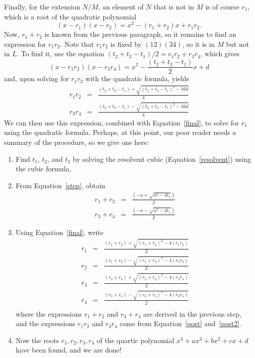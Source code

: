 \documentclass[12pt]{article}
\begin{document}
Finally, for the extension $N/M$, an element of $N$ that is not in $M$
is of course $r_1$, which is a root of the quadratic polynomial
\begin{equation}\label{final}
(x-r_1)(x-r_2) = x^2 - (r_1+r_2) x + r_1 r_2.
\end{equation}
Now, $r_1+r_2$ is known from the previous paragraph, so it remains to
find an expression for $r_1 r_2$. Note that $r_1 r_2$ is fixed by
$(12)(34)$, so it is in $M$ but not in $L$. To find it, use the
equation $(t_2 + t_3 - t_1)/2 = r_1 r_2 + r_3 r_4$, which gives
$$
(x - r_1 r_2) (x - r_3 r_4) = x^2 - \frac{(t_2 + t_3 - t_1)}{2} x + d
$$
and, upon solving for $r_1 r_2$ with the quadratic formula, yields
\begin{eqnarray}
\label{post}
r_1 r_2 & = & \frac{(t_2 + t_3 - t_1) + \sqrt{(t_2 + t_3 - t_1)^2 - 16d}}{4} \\
\label{post2}
r_3 r_4 & = & \frac{(t_2 + t_3 - t_1) - \sqrt{(t_2 + t_3 - t_1)^2 - 16d}}{4}
\end{eqnarray}
We can then use this expression, combined with Equation~\eqref{final},
to solve for $r_1$ using the quadratic formula. Perhaps, at this
point, our poor reader needs a summary of the procedure, so we give one
here:
\begin{enumerate}
\item Find $t_1$, $t_2$, and $t_3$ by solving the resolvent cubic
  (Equation~\eqref{resolvent}) using the cubic formula,
\item From Equation~\eqref{step}, obtain
\begin{eqnarray*}
r_1+r_2 & = & \frac{(-a + \sqrt{a^2 - 4 t_1})}{2} \\
r_3+r_4 & = & \frac{(-a - \sqrt{a^2 - 4 t_1})}{2}
\end{eqnarray*}
\item Using Equation~\eqref{final}, write
\begin{eqnarray*}
r_1 & = & \frac{(r_1+r_2) + \sqrt{(r_1+r_2)^2 - 4 (r_1 r_2)}}{2} \\
r_2 & = & \frac{(r_1+r_2) - \sqrt{(r_1+r_2)^2 - 4 (r_1 r_2)}}{2} \\
r_3 & = & \frac{(r_3+r_4) + \sqrt{(r_3+r_4)^2 - 4 (r_3 r_4)}}{2} \\
r_4 & = & \frac{(r_3+r_4) - \sqrt{(r_3+r_4)^2 - 4 (r_3 r_4)}}{2} \\
\end{eqnarray*}
where the expressions $r_1+r_2$ and $r_3+r_4$ are derived in the previous step, and the expressions $r_1 r_2$ and $r_3 r_4$ come from Equation~\eqref{post} and~\eqref{post2}.
\item Now the roots $r_1,r_2,r_3,r_4$ of the quartic polynomial $x^4 + ax^3 + bx^2 + cx + d$ have been found, and we are done!
\end{enumerate}
\end{document}
